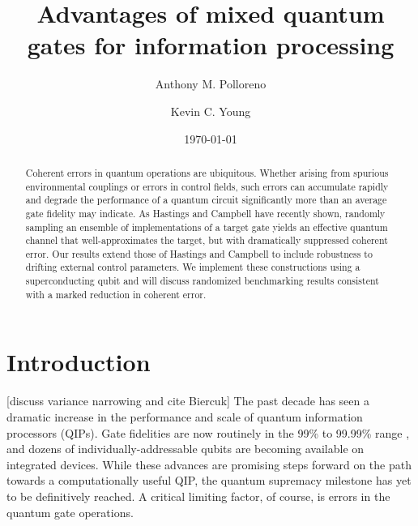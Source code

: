 \documentclass[aps,nofootinbib,pra,notitlepage,twocolumn]{revtex4-1}
\newcommand{\note}[1]{{\color{red}[#1]}}
\begin{document}
\title{Advantages of mixed quantum gates for information processing}

\author{Anthony M. Polloreno}

\author{Kevin C. Young}

\date{\today}

\begin{abstract}
Coherent errors in quantum operations are ubiquitous. Whether arising from spurious environmental couplings or errors in control fields, such errors can accumulate rapidly and degrade the performance of a quantum circuit significantly more than an average gate fidelity may indicate. As Hastings and Campbell have recently shown, randomly sampling an ensemble of implementations of a target gate yields an effective quantum channel that well-approximates the target, but with dramatically suppressed coherent error. Our results extend those of Hastings and Campbell to include robustness to drifting external control parameters. We implement these constructions using a superconducting qubit and will discuss randomized benchmarking results consistent with a marked reduction in coherent error.
\end{abstract}

\pacs{}

\maketitle


\section{Introduction}
\label{sec:introduction}
\note{discuss variance narrowing and cite Biercuk}
The past decade has seen a dramatic increase in the performance and scale of quantum information processors (QIPs). Gate fidelities are now routinely in the 99\% to 99.99\% range \cite{Barends2014, Ballance2016, 1901.08035}, and dozens of individually-addressable qubits are becoming available on integrated devices. While these advances are promising steps forward on the path towards a computationally useful QIP, the quantum supremacy \cite{1203.5813} milestone has yet to be definitively reached. A critical limiting factor, of course, is errors in the quantum gate operations.
\end{document}
